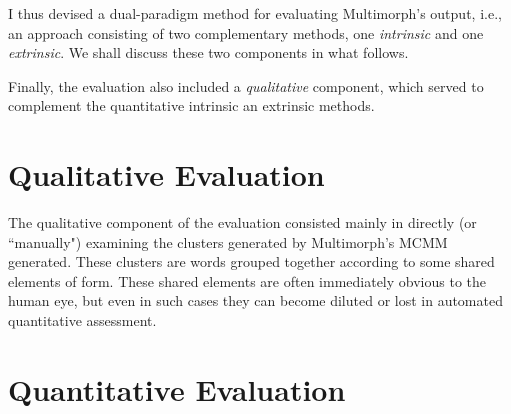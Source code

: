 
I thus devised a dual-paradigm method for evaluating Multimorph's output, i.e., an approach consisting of two complementary methods, %
one \emph{intrinsic} and one \emph{extrinsic}. We shall discuss these two components in what follows.

Finally, the evaluation also included a \emph{qualitative} component, which served to complement the quantitative 
 intrinsic an extrinsic methods.


\section{Qualitative Evaluation} \label{sec:qualitative}
The qualitative component of the evaluation consisted mainly in directly (or ``manually") examining the clusters generated by Multimorph's MCMM generated. These clusters are words grouped together according to some shared elements of form. These shared elements are often immediately obvious to the human eye, but even in such cases they can become diluted or lost in automated quantitative assessment.   %

\section{Quantitative Evaluation}
